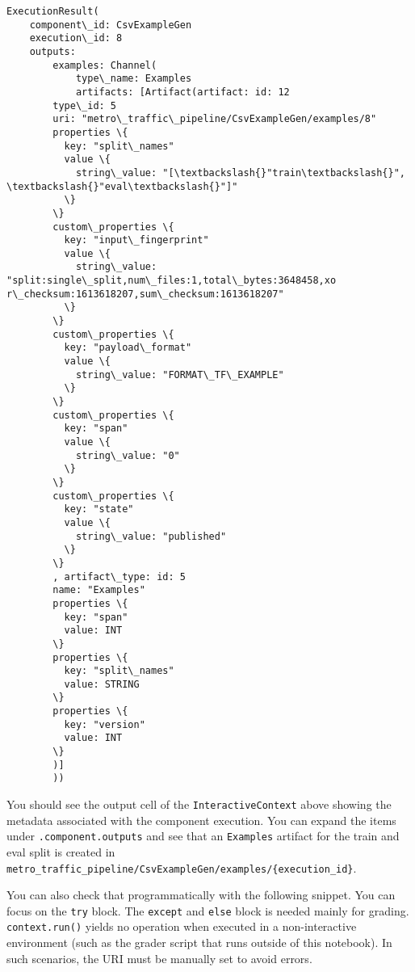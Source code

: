 \documentclass[11pt]{article}
\makeatletter
\newcommand{\boxspacing}{\kern\kvtcb@left@rule\kern\kvtcb@boxsep}
\newcommand{\prompt}[4]{
        {\ttfamily\llap{{\color{#2}[#3]:\hspace{3pt}#4}}\vspace{-\baselineskip}}
    }
\makeatother
\begin{document}
    
    
            \begin{tcolorbox}[breakable, size=fbox, boxrule=.5pt, pad at break*=1mm, opacityfill=0]
\prompt{Out}{outcolor}{5}{\boxspacing}
\begin{Verbatim}[commandchars=\\\{\}]
ExecutionResult(
    component\_id: CsvExampleGen
    execution\_id: 8
    outputs:
        examples: Channel(
            type\_name: Examples
            artifacts: [Artifact(artifact: id: 12
        type\_id: 5
        uri: "metro\_traffic\_pipeline/CsvExampleGen/examples/8"
        properties \{
          key: "split\_names"
          value \{
            string\_value: "[\textbackslash{}"train\textbackslash{}", \textbackslash{}"eval\textbackslash{}"]"
          \}
        \}
        custom\_properties \{
          key: "input\_fingerprint"
          value \{
            string\_value: "split:single\_split,num\_files:1,total\_bytes:3648458,xo
r\_checksum:1613618207,sum\_checksum:1613618207"
          \}
        \}
        custom\_properties \{
          key: "payload\_format"
          value \{
            string\_value: "FORMAT\_TF\_EXAMPLE"
          \}
        \}
        custom\_properties \{
          key: "span"
          value \{
            string\_value: "0"
          \}
        \}
        custom\_properties \{
          key: "state"
          value \{
            string\_value: "published"
          \}
        \}
        , artifact\_type: id: 5
        name: "Examples"
        properties \{
          key: "span"
          value: INT
        \}
        properties \{
          key: "split\_names"
          value: STRING
        \}
        properties \{
          key: "version"
          value: INT
        \}
        )]
        ))
\end{Verbatim}
\end{tcolorbox}
        
    You should see the output cell of the \texttt{InteractiveContext} above
showing the metadata associated with the component execution. You can
expand the items under \texttt{.component.outputs} and see that an
\texttt{Examples} artifact for the train and eval split is created in
\texttt{metro\_traffic\_pipeline/CsvExampleGen/examples/\{execution\_id\}}.

You can also check that programmatically with the following snippet. You
can focus on the \texttt{try} block. The \texttt{except} and
\texttt{else} block is needed mainly for grading. \texttt{context.run()}
yields no operation when executed in a non-interactive environment (such
as the grader script that runs outside of this notebook). In such
scenarios, the URI must be manually set to avoid errors.
\end{document}
